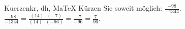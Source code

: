 \begin{MAufgabe}{Kuerzen}{kr, dh, MaTeX}
K\"urzen Sie soweit m\"oglich: $\frac{-98}{-1344}$.\\ 
\ifLsg\MLoesung
\quad $\frac{-98}{-1344}=\frac{(14)\cdot(-7)}{(14)\cdot(-96)}=\frac{-7}{-96}=\frac{7}{96}$.\else\relax\fi
 \end{MAufgabe}
